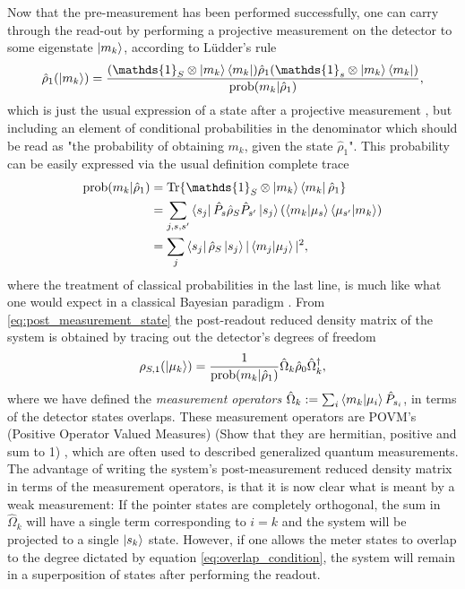 \documentclass{article}
\newcommand{\Id}{\mathds{1}}
\newcommand\sj[1]{ {\color{orange} #1} }
\begin{document}
Now that the pre-measurement has been performed successfully, one can carry through the read-out by performing 
a projective measurement on the detector to some eigenstate $\ket{m_k}$, according to Lüdder's rule 
\begin{align}\label{eq:post_measurement_state}
    \hat{\rho}_1(\ket{m_k}) = \frac{ (\Id_S \otimes \ket{m_k}\bra{m_k}) \hat{\rho}_1 
    (\Id_s \otimes \ket{m_k}\bra{m_k})}{\text{prob}(m_k|\hat{\rho}_1)},
\end{align} 
which is just the usual expression of a state after a projective measurement \cite{PreskillQuantum}, but 
including an element of conditional probabilities in the denominator which should be read as "the probability
of obtaining $m_k$, given the state $\hat{\rho}_1$". This probability can be easily expressed via the usual 
definition complete trace
\begin{align}
    \text{prob}(m_k|\hat{\rho}_1) & = \Tr{ \Id_S \otimes \ket{m_k}\bra{m_k}\hat{\rho}_1} \\ \nonumber 
            & = \sum_{j,s,s^\prime} \bra{s_j} \hat{P}_s \hat{\rho}_S \hat{P}_{s^\prime} \ket{s_j} 
            (\bra{m_k}\ket{\mu_s}\bra{\mu_{s^\prime}} \ket{m_k}) \nonumber \\ 
            & = \sum_{j} \bra{s_j} \hat{\rho}_{S}\ket{s_j} | \bra{m_j}\ket{\mu_j}|^2,
\end{align}
where the treatment of classical probabilities in the last line, is much like what one would expect in a 
classical Bayesian paradigm \cite{svenssonPedagogicalWeak2013}. From \eqref{eq:post_measurement_state} the post-readout reduced density matrix of the system is obtained by tracing out the detector's degrees of 
freedom
\begin{align}
    \rho_{S,1}(\ket{\mu_k}) = \frac{1}{\text{prob}(m_k|\hat{\rho}_1)} \hat{\Omega}_k \hat{\rho}_0 \hat{\Omega}_k^{\dagger},
\end{align}
where we have defined the \textit{measurement operators} $\hat{\Omega}_k :=\sum_{i} \bra{m_k}\ket{\mu_i} \hat{P}_{s_i}$, in terms of the detector states 
overlaps. These measurement operators are POVM's \cite{PreskillQuantum} (Positive Operator Valued
Measures)
\sj{(Show that they are hermitian, positive and sum to 1)}, which are often used to described
generalized quantum measurements. The advantage of writing 
the system's post-measurement reduced density matrix in terms of the
measurement operators, is that it is now clear what is meant by a weak measurement:
 If the pointer states are completely orthogonal,
the sum in $\hat{\Omega}_k$ will have a single term corresponding to $i=k$
and the system will be projected to a single $\ket{s_k}$ state. However,
if one allows the meter states to overlap to the degree dictated by equation \eqref{eq:overlap_condition}, the system will remain in a superposition of states after performing the readout. 
\end{document}
